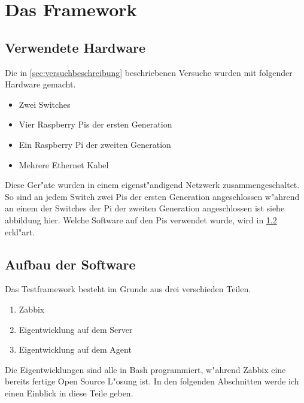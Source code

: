 \chapter{Das Framework}
\label{cha:framework}
\section{Verwendete Hardware} \label{sec:verwendeteHardware}
Die in \cref{sec:versuchbeschreibung} beschriebenen Versuche wurden mit folgender Hardware gemacht. %
\begin{itemize}
\item Zwei Switches
\item Vier Raspberry Pis der ersten Generation
\item Ein Raspberry Pi der zweiten Generation
\item Mehrere Ethernet Kabel
\end{itemize}
Diese Ger"ate wurden in einem eigenst"andigend Netzwerk zusammengeschaltet. So sind an jedem Switch zwei Pis %
der ersten Generation angeschlossen w"ahrend an einem der Switches der Pi der zweiten Generation angeschlossen %
ist siehe abbildung hier. Welche Software auf den Pis verwendet wurde, wird in \cref{sec:aufbauSoftware} erkl"art. 

\section{Aufbau der Software} \label{sec:aufbauSoftware}
Das Testframework besteht im Grunde aus drei verschieden Teilen. %
\begin{enumerate}
\item Zabbix %
\item Eigentwicklung auf dem Server %
\item Eigentwicklung auf dem Agent %
\end{enumerate}
Die Eigentwicklungen sind alle in Bash programmiert, w"ahrend Zabbix eine bereits fertige Open Source L"osung %
ist. In den folgenden Abschnitten werde ich einen Einblick in diese Teile geben. %

